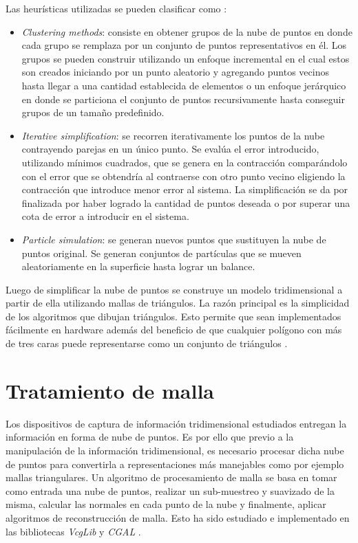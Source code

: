 Las heurísticas utilizadas se pueden clasificar como \cite{PntCloud}:
\begin{itemize}
   \item \emph{Clustering methods}: consiste en obtener grupos de la nube de puntos en donde cada grupo se remplaza por un conjunto de puntos representativos en él. Los grupos se pueden construir utilizando un enfoque incremental en el cual estos son creados iniciando por un punto aleatorio y agregando puntos vecinos hasta llegar a una cantidad establecida de elementos o un enfoque jerárquico en donde se particiona el conjunto de puntos recursivamente hasta conseguir grupos de un tamaño predefinido.
   \item \emph{Iterative simplification}: se recorren iterativamente los puntos de la nube contrayendo parejas en un único punto. Se evalúa el error introducido, utilizando mínimos cuadrados, que se genera en la contracción comparándolo con el error que se obtendría al contraerse con otro punto vecino eligiendo la contracción que introduce menor error al sistema. La simplificación se da por finalizada por haber logrado la cantidad de puntos deseada o por superar una cota de error a introducir en el sistema.
   \item \emph{Particle simulation}: se generan nuevos puntos que sustituyen la nube de puntos original. Se generan conjuntos de partículas que se mueven aleatoriamente en la superficie hasta lograr un balance. %
\end{itemize}

Luego de simplificar la nube de puntos se construye un modelo tridimensional a partir de ella utilizando mallas de triángulos. La razón principal es la simplicidad de los algoritmos que dibujan triángulos. Esto permite que sean implementados fácilmente en hardware además del beneficio de que cualquier polígono con más de tres caras puede representarse como un conjunto de triángulos \cite{PCloudTriangle}.

\section{Tratamiento de malla}

Los dispositivos de captura de información tridimensional estudiados entregan la información en forma de nube de puntos. Es por ello que previo a la manipulación de la información tridimensional, es necesario procesar dicha nube de puntos para convertirla a representaciones más manejables como por ejemplo mallas triangulares.
Un algoritmo de procesamiento de malla se basa en tomar como entrada una nube de puntos, realizar un sub-muestreo y suavizado de la misma, calcular las normales en cada punto de la nube y finalmente, aplicar algoritmos de reconstrucción de malla. Esto ha sido estudiado e implementado en las bibliotecas \emph{VcgLib} \cite{VCGLib} y \emph{CGAL} \cite{CGAL}.

